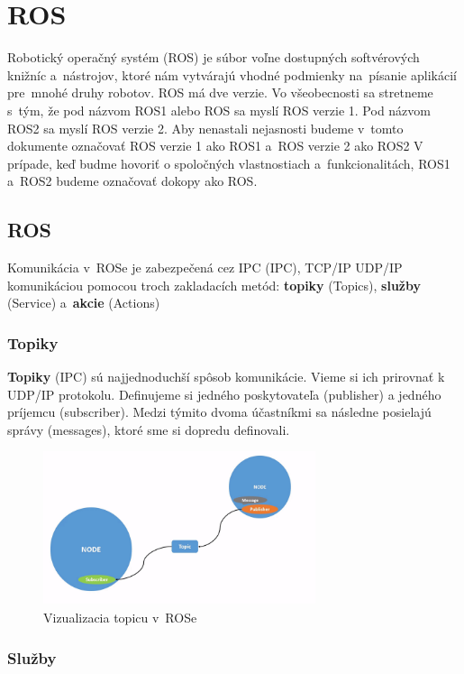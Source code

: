 \section{ROS}
\noindent Robotický operačný systém (\acrlong{ROS}) je súbor voľne dostupných softvérových knižníc a~nástrojov, ktoré nám vytvárajú
vhodné podmienky na~písanie aplikácií pre~mnohé druhy robotov. ROS má dve verzie. Vo všeobecnosti sa stretneme s~tým, že pod názvom
ROS1 alebo ROS sa myslí ROS verzie 1. Pod názvom ROS2 sa myslí ROS verzie 2. Aby nenastali nejasnosti budeme v~tomto dokumente
označovať ROS verzie 1 ako ROS1 a~ROS verzie 2 ako ROS2 V prípade, keď budme hovoriť o spoločných vlastnostiach a~funkcionalitách,
ROS1 a~ROS2 budeme označovať dokopy ako ROS.

\subsection{ROS}

\noindent Komunikácia v~ROSe je zabezpečená cez IPC (\acrlong{IPC}), TCP/IP UDP/IP komunikáciou pomocou troch zakladacích metód:
\textbf{topiky} (Topics), \textbf{služby} (Service) a~\textbf{akcie} (Actions)

\subsubsection{Topiky}

\textbf {Topiky} (IPC) sú najjednoduchší spôsob komunikácie. Vieme si ich prirovnať k UDP/IP protokolu. Definujeme si jedného poskytovateľa (publisher)
a jedného príjemcu (subscriber). Medzi týmito dvoma účastníkmi sa následne posielajú správy (messages), ktoré sme si dopredu definovali.

\begin{figure}[h]
	\centering
	\includegraphics[width=8cm]{img/topicsExplanation.png}
	\caption{Vizualizacia topicu v~ROSe~\cite{RosDoc}}
	\label{fig:topics}
\end{figure}

\subsubsection{Služby}

